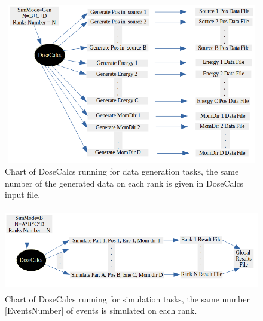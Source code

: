 \documentclass[letterpaper,12pt]{article}
\begin{document}
\begin{figure}[H] 
    \includegraphics[width=12cm,height=7cm]{SimModeGen.png}
    \centering
	\caption{Chart of DoseCalcs running for data generation tasks, the same number of the generated data on each rank is given in DoseCalcs input file. } 
	\label{SimModeGen}
\end{figure}

\begin{figure}[H]
    \includegraphics[width=12cm,height=3.6cm]{SimModeB.png}
    \centering
	\caption{Chart of DoseCalcs running for simulation tasks, the same number [EventsNumber] of events is simulated on each rank.}
	\label{SimModeB}
\end{figure}
\end{document}

